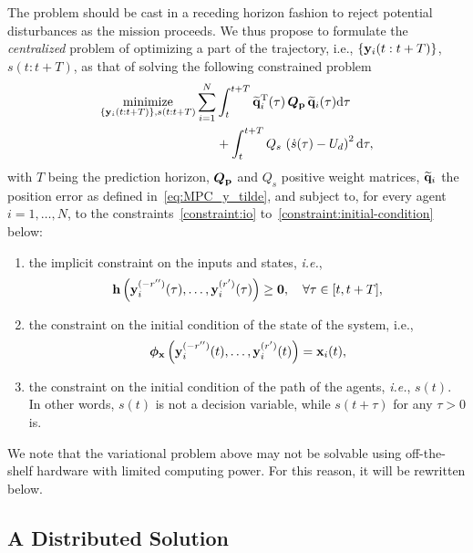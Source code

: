 The problem should be cast in a receding horizon fashion to reject potential disturbances as the mission proceeds.     
We thus propose to formulate the \emph{centralized} problem of optimizing a part of the trajectory, i.e., $\{\mathbf{y}_i(t:t+T)\}$, $s(t:t+T)$, as that of solving the following constrained problem
%
\begin{equation}
    \begin{split}
        \operatorname*{minimize}_{ \left\lbrace \mathbf{y}_i(t:t+T) \right\rbrace, s(t:t+T)}
        \sum_{i=1}^N
        &
        \int_{t}^{t+T}
        \widetilde{\mathbf{q}}_i^{\mathrm{T}}(\tau) \, \bm{Q}_{\mathbf{p}} \, \widetilde{\mathbf{q}}_i(\tau) {\rm d}\tau \\
        & 
        +
        \int_{t}^{t+T} Q_s\,\left(\dot{s}(\tau) - U_d\right)^2 {\rm d}\tau, 
    \end{split}
\label{eq:MPC_optimization_centralized}
\end{equation}
with $T$ being the prediction horizon, $\bm{Q}_{\mathbf{p}}$ and $Q_s$ positive weight matrices, $\widetilde{\mathbf{q}}_{i}$ the position error as defined in~\eqref{eq:MPC_y_tilde}, and subject to, for every agent $i = 1, \ldots, N$, to the constraints~\ref{constraint:io} to~\ref{constraint:initial-condition} below:
\begin{enumerate}[label=C\arabic*]
    \item the implicit constraint on the inputs and states, \emph{i.e.}, $$\mathbf{h} \left( \mathbf{y}_i^{(-r'')}(\tau), \ldots, \mathbf{y}^{(r')}_i(\tau) \right) \geq \bm{0}, \quad \forall \tau \in [t, t + T],$$
    \label{constraint:io}
    \item the constraint on the initial condition of the state of the system, i.e., $$\bm{\phi}_{\mathbf{x}} \left(\mathbf{y}_i^{(-r'')}(t), \ldots, \mathbf{y}^{(r')}_i(t)\right) = \mathbf{x}_{i}(t),$$
    \item the constraint on the initial condition of the path of the agents, \emph{i.e.}, $s(t)$. In other words, $s(t)$ is not a decision variable, while $s(t+\tau)$ for any $\tau > 0$ is.
    \label{constraint:initial-condition}
\end{enumerate}
We note that the variational problem above may not be solvable using off-the-shelf hardware with limited computing power. For this reason, it will be rewritten below.



\subsection{A Distributed Solution}


